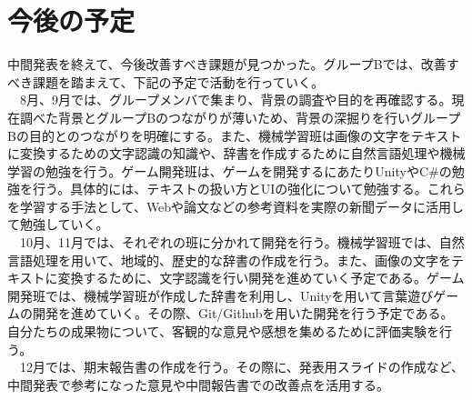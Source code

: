 \section{今後の予定}
中間発表を終えて、今後改善すべき課題が見つかった。グループBでは、改善すべき課題を踏まえて、下記の予定で活動を行っていく。\\
　8月、9月では、グループメンバで集まり、背景の調査や目的を再確認する。現在調べた背景とグループBのつながりが薄いため、背景の深掘りを行いグループBの目的とのつながりを明確にする。また、機械学習班は画像の文字をテキストに変換するための文字認識の知識や、辞書を作成するために自然言語処理や機械学習の勉強を行う。ゲーム開発班は、ゲームを開発するにあたりUnityやC\#の勉強を行う。具体的には、テキストの扱い方とUIの強化について勉強する。これらを学習する手法として、Webや論文などの参考資料を実際の新聞データに活用して勉強していく。\\
　10月、11月では、それぞれの班に分かれて開発を行う。機械学習班では、自然言語処理を用いて、地域的、歴史的な辞書の作成を行う。また、画像の文字をテキストに変換するために、文字認識を行い開発を進めていく予定である。ゲーム開発班では、機械学習班が作成した辞書を利用し、Unityを用いて言葉遊びゲームの開発を進めていく。その際、Git/Githubを用いた開発を行う予定である。自分たちの成果物について、客観的な意見や感想を集めるために評価実験を行う。\\
　12月では、期末報告書の作成を行う。その際に、発表用スライドの作成など、中間発表で参考になった意見や中間報告書での改善点を活用する。